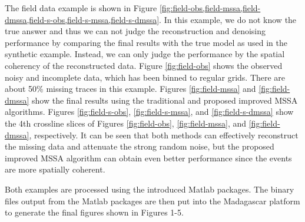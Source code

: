 The field data example is shown in Figure \ref{fig:field-obs,field-mssa,field-dmssa,field-s-obs,field-s-mssa,field-s-dmssa}. In this example, we do not know the true answer and thus we can not judge the reconstruction and denoising performance by comparing the final results with the true model as used in the synthetic example. Instead, we can only judge the performance by the spatial coherency of the reconstructed data. Figure \ref{fig:field-obs} shows the observed noisy and incomplete data, which has been binned to regular grids. There are about 50\% missing traces in this example. Figures \ref{fig:field-mssa} and \ref{fig:field-dmssa} show the final results using the traditional and proposed improved MSSA algorithms. Figures \ref{fig:field-s-obs}, \ref{fig:field-s-mssa}, and \ref{fig:field-s-dmssa} show the 4th crossline slices of Figures \ref{fig:field-obs}, \ref{fig:field-mssa}, and \ref{fig:field-dmssa}, respectively. It can be seen that both methods can effectively reconstruct the missing data and attenuate the strong random noise, but the proposed improved MSSA algorithm can obtain even better performance since the events are more spatially coherent. 

Both examples are processed using the introduced Matlab packages. The binary files output from the Matlab packages are then put into the Madagascar platform to generate the final figures shown in Figures 1-5. 



